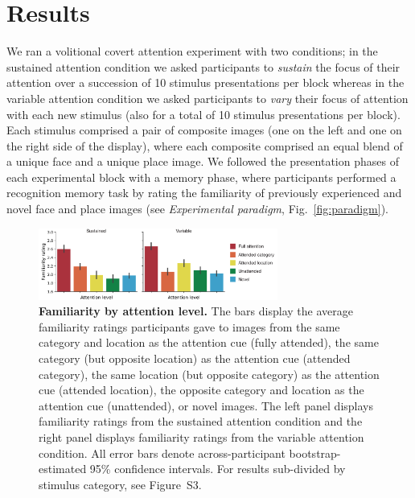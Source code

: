 \documentclass[english]{article}
\newcommand{\ratingsByCategory}{S3}
\begin{document}
\section*{Results}

We ran a volitional covert attention experiment with two conditions; in the
sustained attention condition we asked participants to \textit{sustain} the
focus of their attention over a succession of 10 stimulus presentations per
block whereas in the variable attention condition we asked participants to
\textit{vary} their focus of attention with each new stimulus (also for a total
of 10 stimulus presentations per block). Each stimulus comprised a pair of
composite images (one on the left and one on the right side of the display),
where each composite comprised an equal blend of a unique face and a unique
place image. We followed the presentation phases of each experimental block
with a memory phase, where participants performed a recognition memory task by
rating the familiarity of previously experienced and novel face and place
images (see \textit{Experimental paradigm}, Fig.~\ref{fig:paradigm}).

\begin{figure}[tp]
	\centering
	\includegraphics[width=0.7\textwidth]{figs/familiarity_by_attention_level}
  
  \caption{\textbf{Familiarity by attention level.} The bars display the
  average familiarity ratings participants gave to images from the same
  category and location as the attention cue (fully attended), the same
  category (but opposite location) as the attention cue (attended category),
  the same location (but opposite category) as the attention cue (attended
  location), the opposite category and location as the attention cue
  (unattended), or novel images. The left panel displays familiarity ratings
  from the sustained attention condition and the right panel displays
  familiarity ratings from the variable attention condition. All error bars
  denote across-participant bootstrap-estimated 95\% confidence intervals. For results
  sub-divided by stimulus category, see Figure~\ratingsByCategory.}
  
  \label{fig:familiarity}
  \end{figure}
\end{document}
